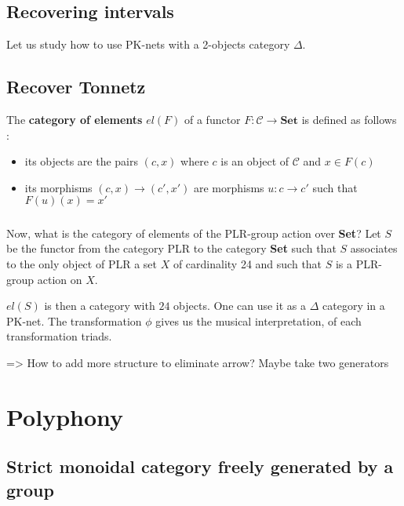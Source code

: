 \documentclass{report}
\begin{document}
\section{Recovering intervals}

Let us study how to use PK-nets with a 2-objects category $\Delta$.






\section{Recover Tonnetz}


\begin{defn} The \textbf{category of elements} $el(F)$ of a functor $F : \mathcal{C}\rightarrow \textbf{Set}$ is defined as follows :
    \begin{itemize}
        \item its objects are the pairs $(c,x)$ where $c$ is an object of $\mathcal{C}$ and $x\in F(c)$
        \item its morphisms $(c,x)\rightarrow (c',x')$ are morphisms $u : c\rightarrow c'$ such that $F(u)(x) = x'$
    \end{itemize}
\end{defn}
\paragraph{}
Now, what is the category of elements of the PLR-group action over \textbf{Set}? Let $S$ be the functor from the category PLR to the category \textbf{Set} such that $S$ associates to the only object of PLR a set $X$ of cardinality 24 and such that $S$ is a PLR-group action on $X$.

$el(S)$ is then a category with $24$ objects. One can use it as a $\Delta$ category in a PK-net. The transformation $\phi$ gives us the musical interpretation, of each transformation triads.

=> How to add more structure to eliminate arrow? Maybe take two generators

\chapter{Polyphony}
\section{Strict monoidal category freely generated by a group}
\end{document}
